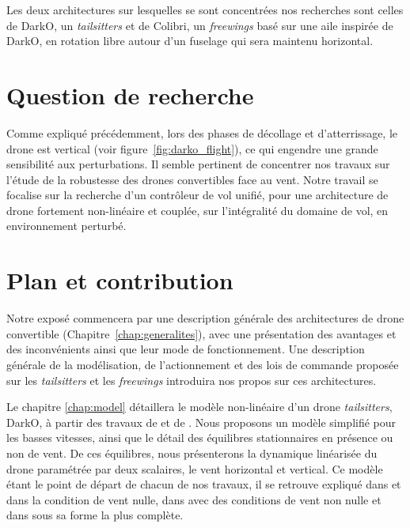 Les deux architectures sur lesquelles se sont concentrées nos recherches sont celles de DarkO, un \textit{tailsitters} et de Colibri, un \textit{freewings} basé sur une aile inspirée de DarkO, en rotation libre autour d'un fuselage qui sera maintenu horizontal.


\section*{Question de recherche}

Comme expliqué précédemment, lors des phases de décollage et d'atterrissage, le drone est vertical (voir figure~\ref{fig:darko_flight}), ce qui engendre une grande sensibilité aux perturbations. Il semble pertinent de concentrer nos travaux sur l'étude de la robustesse des drones convertibles face au vent.
Notre travail se focalise sur la recherche d'un contrôleur de vol unifié, pour une architecture de drone fortement non-linéaire et couplée, sur l'intégralité du domaine de vol, en environnement perturbé.


\section*{Plan et contribution}
Notre exposé commencera par une description générale des architectures de drone convertible (Chapitre~\ref{chap:generalites}), avec une présentation des avantages et des inconvénients ainsi que leur mode de fonctionnement. Une description générale de la modélisation, de l'actionnement et des lois de commande proposée sur les \textit{tailsitters} et les \textit{freewings} introduira nos propos sur ces architectures.

Le chapitre \ref{chap:model} détaillera le modèle non-linéaire d'un drone \textit{tailsitters}, DarkO, à partir des travaux de \cite{lustosaHal-03035938} et de \cite{olszaneckibarthHal-02542982}. Nous proposons un modèle simplifié pour les basses vitesses, ainsi que le détail des équilibres stationnaires en présence ou non de vent. De ces équilibres, nous présenterons la dynamique linéarisée du drone paramétrée par deux scalaires, le vent horizontal et vertical. Ce modèle étant le point de départ de chacun de nos travaux, il se retrouve expliqué dans \cite[Chapitre 2]{sansouStage} et \cite[Section II]{sansouECC} dans la condition de vent nulle, dans \cite[Section 2]{SANSOUACA} avec des conditions de vent non nulle et dans \cite[Section II]{sansouTCST} sous sa forme la plus complète.

